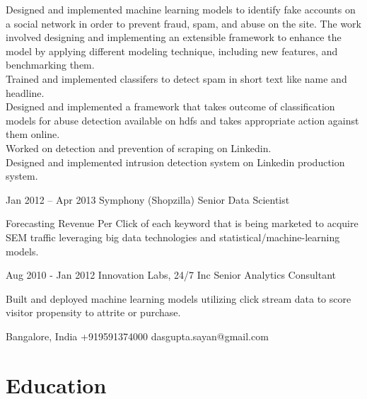 \documentclass{tccv}
\begin{document}
\begin{eventlist}
Designed and implemented machine learning models to identify fake accounts on a social network in
order to prevent fraud, spam, and abuse on the site. The work involved designing and implementing
an extensible framework to enhance the model by applying different modeling technique, including
new features, and benchmarking them. \\[2pt]
Trained and implemented classifers to detect spam in short text like name and headline. \\[2pt]
 Designed and implemented a framework that takes outcome of classification models for abuse detection
available on hdfs and takes appropriate action against them online. \\[2pt]
Worked on detection and prevention of scraping on Linkedin. \\[2pt]
Designed and implemented intrusion detection system on Linkedin production system. \\[2pt]

\item{Jan 2012 -- Apr 2013}
     {Symphony (Shopzilla)}
     {Senior Data Scientist}

Forecasting Revenue Per Click of each keyword that is being marketed to acquire SEM traffic
leveraging big data technologies and statistical/machine-learning models. \\[2pt]

\item{Aug 2010 - Jan 2012}
     {Innovation Labs, 24/7 Inc}
     {Senior Analytics Consultant}

Built and deployed machine learning  models utilizing click stream data to score visitor propensity to attrite or purchase. \\[2pt]
\end{eventlist}

\personal
    {Bangalore, India}
    {+919591374000}
    {dasgupta.sayan@gmail.com}

\section{Education}
\end{document}
